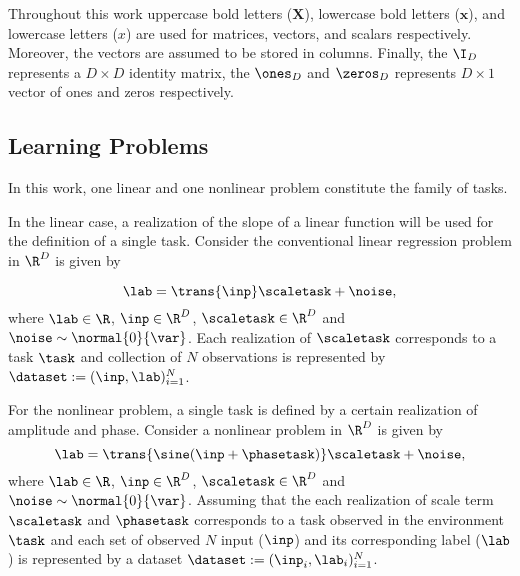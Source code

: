 
Throughout this work uppercase bold letters (\eg $\mathbf{X}$), lowercase bold letters (\eg $\mathbf{x}$), and lowercase letters (\eg ${x}$) are used for matrices, vectors, and scalars respectively. Moreover, the vectors are assumed to be stored in columns. Finally, the $\I_{D}$ represents a $D\times D$ identity matrix, the $\ones_{D}$ and $\zeros_{D}$ represents $D\times 1$ vector of ones and zeros respectively.

\subsection{Learning Problems}

In this work, one linear and one nonlinear problem constitute the family of tasks. 

In the linear case, a realization of the slope of a linear function will be used for the definition of a single task. Consider the conventional linear regression problem in $\R^D$ is given by

\begin{equation}\label{eq:linearreg}
  \lab = \trans{\inp}\scaletask+\noise, 
\end{equation}
where $\lab\in\R$, $\inp\in\R^D$, $\scaletask\in\R^D$ and $\noise\sim\normal{0}{\var}$. Each realization of $\scaletask$ corresponds to a task $\task$ and collection of $N$ observations is represented by $\dataset:=(\inp, \lab)_{i=1}^{N}$. 

For the nonlinear problem, a single task is defined by a certain realization of amplitude and phase. Consider a nonlinear problem in $\R^D$ is given by
\begin{equation}\label{eq:nonlinearreg}
  \lab = \trans{\sine(\inp+\phasetask)}\scaletask+\noise, 
\end{equation}
where $\lab\in\R$, $\inp\in\R^D$, $\scaletask\in\R^D$ and $\noise\sim\normal{0}{\var}$. Assuming that the each realization of scale term $\scaletask$ and $\phasetask$ corresponds to a task observed in the environment $\task$ and each set of observed $N$ input ($\inp$) and its corresponding label ($\lab$) is represented by a dataset $\dataset:=(\inp_i, \lab_i)_{i=1}^{N}$.


